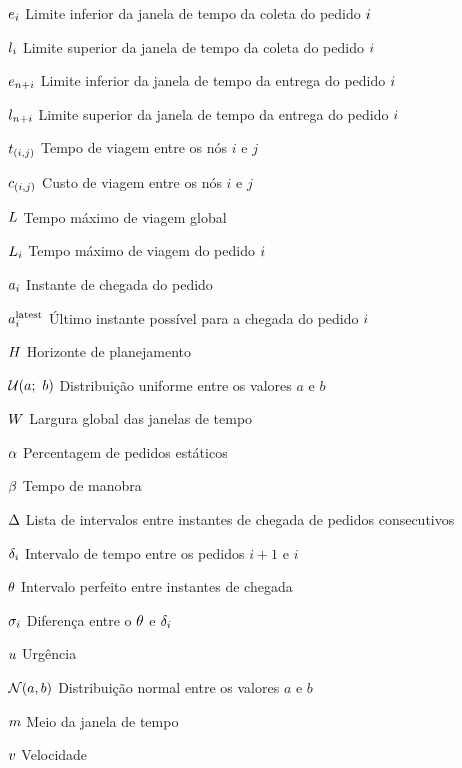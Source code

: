 \begin{simbolos}
    \item[$e_{i}$]
      Limite inferior da janela de tempo da coleta do pedido $i$
    \item[$l_{i}$]
      Limite superior da janela de tempo da coleta do pedido $i$
    \item[$e_{n + i}$]
      Limite inferior da janela de tempo da entrega do pedido $i$
    \item[$l_{n + i}$]
      Limite superior da janela de tempo da entrega do pedido $i$
    \item[$t_{(i,j)}$] Tempo de viagem entre os nós $i$ e $j$
    \item[$c_{(i,j)}$] Custo de viagem entre os nós $i$ e $j$
    \item[$L$] Tempo máximo de viagem global
    \item[$L_i$] Tempo máximo de viagem do pedido 
      $i$
    \item[$a_i$] Instante de chegada do pedido \request
    \item[$a{}_{i{}}^{\mathrm{latest}}$]
      Último instante possível para a chegada do pedido $i$
    \item[$H$] Horizonte de planejamento
    \item[$\mathcal{U}(a;\ b)$]
      Distribuição uniforme entre os valores $a$ e $b$
    \item[$W$] Largura global das janelas de tempo 
    \item[$\alpha$] Percentagem de pedidos estáticos
    \item[$\beta$] Tempo de manobra
    \item[$\Delta$]
      Lista de intervalos entre instantes de chegada de pedidos 
      consecutivos
    \item[$\delta_i$]
      Intervalo de tempo entre os pedidos $i + 1$ e $i$
    \item[$\theta$] Intervalo perfeito entre instantes de chegada
    \item[$\sigma_i$]
      Diferença entre o $\theta$ e 
      $\delta_i$
    \item[$u$] Urgência
    \item[$\mathcal{N}(a,b)$]
       Distribuição normal entre os valores $a$ e $b$
    \item[$m$] Meio da janela de tempo
    \item[$v$] Velocidade
\end{simbolos}
